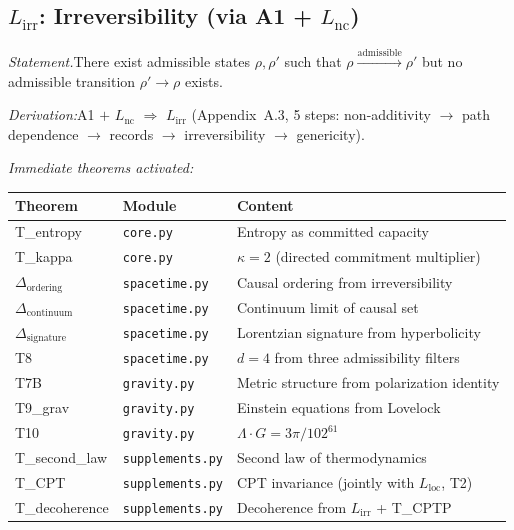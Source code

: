 \documentclass[11pt]{article}
\newcommand{\LG}{\Lambda \cdot G}
\newcommand{\Lnc}{L_{\mathrm{nc}}}
\newcommand{\Lloc}{L_{\mathrm{loc}}}
\newcommand{\Lirr}{L_{\mathrm{irr}}}
\begin{document}
\subsection{\texorpdfstring{$L_{\mathrm{irr}}$}{Lirr}: Irreversibility (via A1 + \texorpdfstring{$L_{\mathrm{nc}}$}{Lnc})}

\begin{tcolorbox}[apfbox, title={$\Lirr$ $\longrightarrow$ Spacetime and Thermodynamics}]
\textit{Statement.}\quad There exist admissible states $\rho, \rho'$ such that $\rho \xrightarrow{\mathrm{admissible}} \rho'$ but no admissible transition $\rho' \to \rho$ exists.

\textit{Derivation:}\quad A1 $+$ $\Lnc$ $\Rightarrow$ $\Lirr$ (Appendix~A.3, 5 steps: non-additivity $\to$ path dependence $\to$ records $\to$ irreversibility $\to$ genericity).

\smallskip\noindent\textit{Immediate theorems activated:}
\begin{center}
\small
\renewcommand{\arraystretch}{1.15}
\begin{tabular}{lll}
\toprule
\textbf{Theorem} & \textbf{Module} & \textbf{Content} \\
\midrule
T\_entropy & \texttt{core.py} & Entropy as committed capacity \\
T\_kappa & \texttt{core.py} & $\kappa = 2$ (directed commitment multiplier) \\
$\Delta_{\mathrm{ordering}}$ & \texttt{spacetime.py} & Causal ordering from irreversibility \\
$\Delta_{\mathrm{continuum}}$ & \texttt{spacetime.py} & Continuum limit of causal set \\
$\Delta_{\mathrm{signature}}$ & \texttt{spacetime.py} & Lorentzian signature from hyperbolicity \\
T8 & \texttt{spacetime.py} & $d = 4$ from three admissibility filters \\
T7B & \texttt{gravity.py} & Metric structure from polarization identity \\
T9\_grav & \texttt{gravity.py} & Einstein equations from Lovelock \\
T10 & \texttt{gravity.py} & $\LG = 3\pi/102^{61}$ \\
T\_second\_law & \texttt{supplements.py} & Second law of thermodynamics \\
T\_CPT & \texttt{supplements.py} & CPT invariance (jointly with $\Lloc$, T2) \\
T\_decoherence & \texttt{supplements.py} & Decoherence from $\Lirr$ + T\_CPTP \\
\bottomrule
\end{tabular}
\end{center}


\end{tcolorbox}
\end{document}
